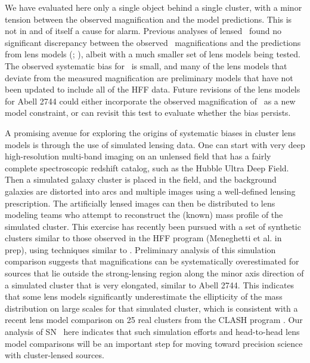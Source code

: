 We have evaluated here only a single object behind a single cluster,
with a minor tension between the observed magnification and the model
predictions.  This is not in and of itself a cause for alarm.
Previous analyses of lensed \SNIa\ found no significant discrepancy
between the observed \SNIa\ magnifications and the predictions from
lens models (; \citealt{Nordin:2014}), albeit
with a much smaller set of lens models being tested.  The observed
systematic bias for \tomas\ is small, and many of the lens models that
deviate from the measured magnification are preliminary models that
have not been updated to include all of the HFF data.  Future
revisions of the lens models for Abell 2744 could either incorporate
the observed magnification of \tomas\ as a new model constraint, or
can revisit this test to evaluate whether the bias persists.

A promising avenue for exploring the origins of systematic biases in
cluster lens models is through the use of simulated lensing data.  One
can start with very deep high-resolution multi-band imaging on an
unlensed field that has a fairly complete spectroscopic redshift
catalog, such as the Hubble Ultra Deep Field.  Then a simulated galaxy
cluster is placed in the field, and the background galaxies are
distorted into arcs and multiple images using a well-defined lensing
prescription.  The artificially lensed images can then be distributed
to lens modeling teams who attempt to reconstruct the (known) mass
profile of the simulated cluster.  This exercise has recently been
pursued with a set of synthetic clusters similar to those observed in
the HFF program (Meneghetti et al. in prep), using techniques
similar to \citet{Meneghetti:2010,Meneghetti:2014}.  Preliminary
analysis of this simulation comparison suggests that
magnifications can be systematically overestimated for
sources that lie outside the strong-lensing region along the minor
axis direction of a simulated cluster that is very
elongated, similar to Abell 2744.  This indicates that some
lens models significantly underestimate the ellipticity of the mass
distribution on large scales for that simulated cluster, which is
consistent with a recent lens model comparison on 25 real clusters
from the CLASH program \citep{Zitrin:2015}. Our analysis of
SN \tomas\ here indicates that such simulation efforts and
head-to-head lens model comparisons will be an important step for
moving toward precision science with cluster-lensed sources.  

